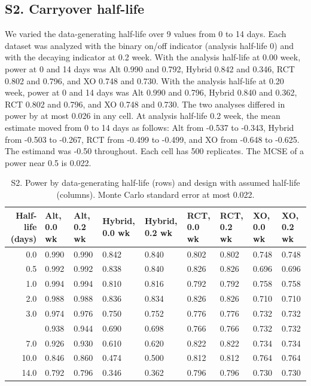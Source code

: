 \documentclass[
  11pt,
]{article}
\begin{document}
\subsection{S2. Carryover half-life}\label{s2.-carryover-half-life}

We varied the data-generating half-life over 9 values from 0 to 14 days. Each dataset was analyzed with the binary on/off indicator (analysis half-life 0) and with the decaying indicator at 0.2 week. With the analysis half-life at 0.00 week, power at 0 and 14 days was Alt 0.990 and 0.792, Hybrid 0.842 and 0.346, RCT 0.802 and 0.796, and XO 0.748 and 0.730. With the analysis half-life at 0.20 week, power at 0 and 14 days was Alt 0.990 and 0.796, Hybrid 0.840 and 0.362, RCT 0.802 and 0.796, and XO 0.748 and 0.730. The two analyses differed in power by at most 0.026 in any cell. At analysis half-life 0.2 week, the mean estimate moved from 0 to 14 days as follows: Alt from -0.537 to -0.343, Hybrid from -0.503 to -0.267, RCT from -0.499 to -0.499, and XO from -0.648 to -0.625. The estimand was -0.50 throughout. Each cell has 500 replicates. The MCSE of a power near 0.5 is 0.022.

\begin{table}
\centering
\caption{\label{tab:s2-tab}S2. Power by data-generating half-life (rows) and design with assumed half-life (columns). Monte Carlo standard error at most 0.022.}
\centering
\fontsize{7}{9}\selectfont
\begin{tabular}[t]{rllllllll}
\toprule
Half-life (days) & Alt, 0.0 wk & Alt, 0.2 wk & Hybrid, 0.0 wk & Hybrid, 0.2 wk & RCT, 0.0 wk & RCT, 0.2 wk & XO, 0.0 wk & XO, 0.2 wk\\
\midrule
0.0 & 0.990 & 0.990 & 0.842 & 0.840 & 0.802 & 0.802 & 0.748 & 0.748\\
0.5 & 0.992 & 0.992 & 0.838 & 0.840 & 0.826 & 0.826 & 0.696 & 0.696\\
1.0 & 0.994 & 0.994 & 0.810 & 0.816 & 0.792 & 0.792 & 0.758 & 0.758\\
2.0 & 0.988 & 0.988 & 0.836 & 0.834 & 0.826 & 0.826 & 0.710 & 0.710\\
3.0 & 0.974 & 0.976 & 0.750 & 0.752 & 0.776 & 0.776 & 0.732 & 0.732\\
\addlinespace
5.0 & 0.938 & 0.944 & 0.690 & 0.698 & 0.766 & 0.766 & 0.732 & 0.732\\
7.0 & 0.926 & 0.930 & 0.610 & 0.620 & 0.822 & 0.822 & 0.734 & 0.734\\
10.0 & 0.846 & 0.860 & 0.474 & 0.500 & 0.812 & 0.812 & 0.764 & 0.764\\
14.0 & 0.792 & 0.796 & 0.346 & 0.362 & 0.796 & 0.796 & 0.730 & 0.730\\
\bottomrule
\end{tabular}
\end{table}
\end{document}
